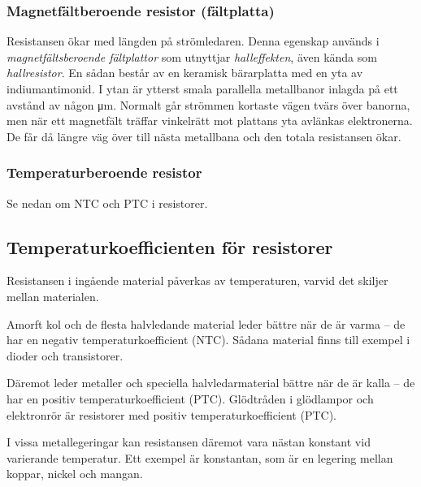 \subsubsection{Magnetfältberoende resistor (fältplatta)}

Resistansen ökar med längden på strömledaren. Denna egenskap används i
\emph{magnetfältsberoende fältplattor} som utnyttjar \emph{halleffekten}, även
kända som \emph{hallresistor}. En sådan består av en keramisk bärarplatta med
en yta av indiumantimonid.
I ytan är ytterst smala parallella metallbanor inlagda på ett avstånd av någon
\unit{\micro\metre}.
Normalt går strömmen kortaste vägen tvärs över banorna, men när ett magnetfält
träffar vinkelrätt mot plattans yta avlänkas elektronerna.
De får då längre väg över till nästa metallbana och den totala resistansen
ökar.

\subsubsection{Temperaturberoende resistor}

Se nedan om NTC och PTC i resistorer.

\subsection{Temperaturkoefficienten för resistorer}
\label{resistor_temperaturkoefficient}

Resistansen i ingående material påverkas av temperaturen, varvid det skiljer
mellan materialen.

Amorft kol och de flesta halvledande material leder bättre när de är varma -- de
har en negativ temperaturkoefficient (NTC). Sådana material finns till exempel i
dioder och transistorer.

Däremot leder metaller och speciella halvledarmaterial bättre när de är kalla
-- de har en positiv temperaturkoefficient (PTC). Glödtråden i glödlampor och
elektronrör är resistorer med positiv temperaturkoefficient (PTC).

I vissa metallegeringar kan resistansen däremot vara nästan konstant vid
varierande temperatur.
Ett exempel är konstantan, som är en legering mellan koppar, nickel och mangan.

